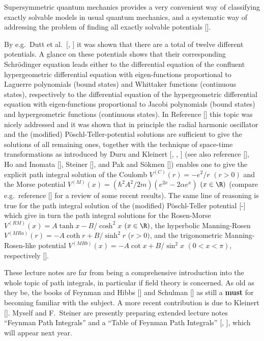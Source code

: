 Supersymmetric quantum mechanics provides a very convenient way of
classifying exactly solvable models in usual quantum mechanics, and a
systematic way of addressing the problem of finding all exactly solvable
potentials [\INH].

By e.g.\ Dutt et al.\ [\DDS, \DKS] it was shown that there are a total
of twelve different potentials. A glance on these potentials shows that
their corresponding Schr\"odinger equation leads either to the
differential equation of the confluent hypergeometric differential
equation with eigen-functions proportional to Laguerre polynomials
(bound states) and Whittaker functions (continuous states),
respectively to the differential equation of the hypergeometric
differential equation with eigen-functions proportional to Jacobi
polynomials (bound states) and hypergeometric functions (continuous
states). In Reference [\DDS] this topic was nicely addressed and it was
shown that in principle the radial harmonic oscillator and the
(modified) P\"oschl-Teller-potential solutions are sufficient to give
the solutions of all remaining ones, together with the technique of
space-time transformations as introduced by Duru and Kleinert [\DKa,
\DKb, \KLEh] (see also reference [\GRSb], Ho and Inomata [\HOI],
Steiner [\STEa], and Pak and S\"okmen [\PAKSc]) enables one to give the
explicit path integral solution of the Coulomb $V^{(C)}(r)=-e^2/r$
$(r>0)$ and the Morse potential $V^{(M)}(x)=(\hbar^2A^2/2m) (e^{2x}
-2\alpha e^x)$ $(x\in\R)$ (compare e.g.\ reference [\GROm] for a review
of some recent results). The same line of reasoning is true for the
path integral solution of the (modified) P\"oschl-Teller potential
[\BJb-\FLM] which give in turn the path integral solutions for the
Rosen-Morse $V^{(RM)}(x)=A\tanh x-B/\cosh^2x$ $(x\in\R)$, the
hyperbolic Manning-Rosen $V^{(MRa)}(r)=-A\coth r+B/\sinh^2r$ ($r>0)$,
and the trigonometric Manning-Rosen-like potential $V^{(MRb)}
(x)=-A\cot x+B/\sin^2x$ $(0<x<\pi)$, respectively [\GROe].

These lecture notes are far from being a comprehensive introduction
into the whole topic of path integrals, in particular if field theory is
concerned. As old as they be, the books of Feynman and Hibbs [\FH] and
Schulman [\SCHUc] as still a {\bf must} for becoming familiar with the
subject. A more recent contribution is due to Kleinert [\KLEm].
Myself and F.\ Steiner are presently preparing extended lecture notes
``Feynman Path Integrals''  and a ``Table of Feynman Path Integrals''
[\GRSf, \GRSg], which will appear next year.

